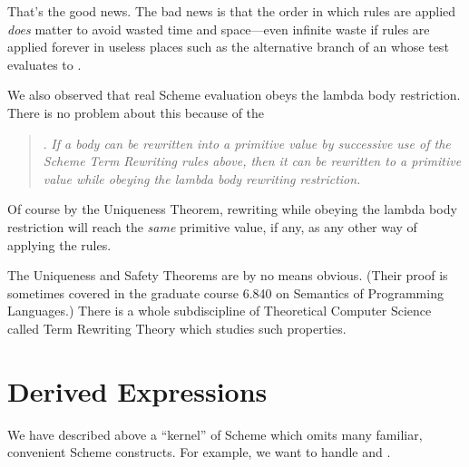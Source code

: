 \documentclass[11pt]{article}
\begin{document}
That's the good news.  The bad news is that the order in which rules
are applied {\em does} matter to avoid wasted time and space---even
infinite waste if rules are applied forever in useless places such as
the alternative branch of an  whose test evaluates to
.

We also observed that real Scheme evaluation obeys the lambda body
restriction.  There is no problem about this because of the
\begin{quote}
.  {\em If a body can be
rewritten into a primitive value by successive use of the Scheme Term
Rewriting rules above, then it can be rewritten to a primitive value while
obeying the lambda body rewriting restriction.}
\end{quote}

Of course by the Uniqueness Theorem, rewriting while obeying the lambda
body restriction will reach the {\em same} primitive value, if any, as any
other way of applying the rules.

The Uniqueness and Safety Theorems are by no means obvious.  (Their proof
is sometimes covered in the graduate course 6.840 on Semantics of
Programming Languages.)  There is a whole subdiscipline of Theoretical
Computer Science called Term Rewriting Theory which studies such
properties.

\section{Derived Expressions}

We have described above a ``kernel'' of Scheme which omits many familiar,
convenient Scheme constructs.  For example, we want to handle 
and .
\end{document}
